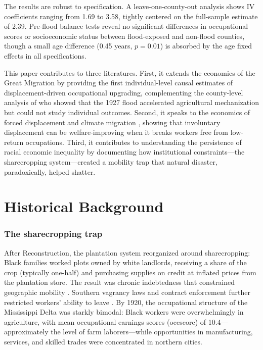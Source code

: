 \documentclass[12pt]{article}
\begin{document}
The results are robust to specification. A leave-one-county-out analysis shows IV coefficients ranging from 1.69 to 3.58, tightly centered on the full-sample estimate of 2.39. Pre-flood balance tests reveal no significant differences in occupational scores or socioeconomic status between flood-exposed and non-flood counties, though a small age difference (0.45 years, $p = 0.01$) is absorbed by the age fixed effects in all specifications.

This paper contributes to three literatures. First, it extends the economics of the Great Migration \citep{collins_1997, boustan_2010, black_etal_2015} by providing the first individual-level causal estimates of displacement-driven occupational upgrading, complementing the county-level analysis of \citet{hornbeck_naidu_2014} who showed that the 1927 flood accelerated agricultural mechanization but could not study individual outcomes. Second, it speaks to the economics of forced displacement and climate migration \citep{cattaneo_peri_2016, mahajan_yang_2020, deryugina_2017}, showing that involuntary displacement can be welfare-improving when it breaks workers free from low-return occupations. Third, it contributes to understanding the persistence of racial economic inequality \citep{derenoncourt_2022, logan_parman_2017} by documenting how institutional constraints---the sharecropping system---created a mobility trap that natural disaster, paradoxically, helped shatter.


\section{Historical Background}

\subsubsection*{The sharecropping trap} After Reconstruction, the plantation system reorganized around sharecropping: Black families worked plots owned by white landlords, receiving a share of the crop (typically one-half) and purchasing supplies on credit at inflated prices from the plantation store. The result was chronic indebtedness that constrained geographic mobility \citep{ransom_sutch_1977}. Southern vagrancy laws and contract enforcement further restricted workers' ability to leave \citep{naidu_2010}. By 1920, the occupational structure of the Mississippi Delta was starkly bimodal: Black workers were overwhelmingly in agriculture, with mean occupational earnings scores (occscore) of 10.4---approximately the level of farm laborers---while opportunities in manufacturing, services, and skilled trades were concentrated in northern cities.
\end{document}
